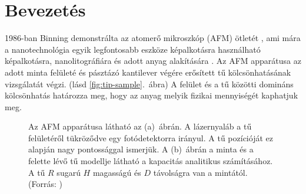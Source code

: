 \chapter{Bevezetés}
	1986-ban Binning demonstrálta az atomerő mikroszkóp (AFM) ötletét \cite{Binnig1986}, ami mára 
	a nanotechnológia egyik legfontosabb eszköze képalkotásra használható képalkotásra, nanolitográfiára és 
	adott anyag alakítására \cite{Vasic2013}.
	Az AFM apparátusa az adott minta felületé és pásztázó kantilever végére erősített tű 
	kölcsönhatásának vizsgálatát végzi. (lásd \ref{fig:tip-sample}.~ábra)
	A felület és a tű közötti domináns kölcsönhatás határozza meg, hogy az anyag melyik fizikai
	mennyiségét kaphatjuk meg.
	\begin{figure}[H]
		\centering
		\hfil
		\caption{Az AFM apparátusa látható az (a)~ábrán. A lázernyaláb
		a tű felületéről tükröződve egy fotódetektorra irányul. A tű pozícióját ez alapján nagy pontossággal ismerjük. A
		(b)~ábrán a minta és a felette lévő tű modellje látható a kapacitás analitikus számításához.
		A tű $R$ sugarú $H$ magasságú és $D$ távolságra van a mintától. (Forrás: \cite{Butt20051})}
		\label{fig:fig_sim}
	\end{figure}
